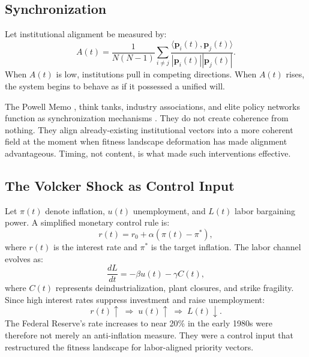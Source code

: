 \documentclass[12pt, a4paper]{article}
\theoremstyle{named}
\begin{document}
\subsection{Synchronization}

Let institutional alignment be measured by:
\[
  A(t) = \frac{1}{N(N-1)}
  \sum_{i \neq j}
  \frac{\langle \mathbf{p}_i(t), \mathbf{p}_j(t)\rangle}
       {|\mathbf{p}_i(t)||\mathbf{p}_j(t)|}.
\]
When $A(t)$ is low, institutions pull in competing directions. When
$A(t)$ rises, the system begins to behave as if it possessed a unified
will.

The Powell Memo \cite{powell1971}, think tanks, industry associations,
and elite policy networks function as synchronization mechanisms
\cite{mirowski2013,harvey2005}. They do not create coherence from
nothing. They align already-existing institutional vectors into a more
coherent field at the moment when fitness landscape deformation has made
alignment advantageous. Timing, not content, is what made such
interventions effective.

\subsection{The Volcker Shock as Control Input}

Let $\pi(t)$ denote inflation, $u(t)$ unemployment, and $L(t)$ labor
bargaining power. A simplified monetary control rule is:
\[
  r(t) = r_0 + \alpha(\pi(t) - \pi^{\ast}),
\]
where $r(t)$ is the interest rate and $\pi^{\ast}$ is the target
inflation. The labor channel evolves as:
\[
  \frac{dL}{dt} = -\beta u(t) - \gamma C(t),
\]
where $C(t)$ represents deindustrialization, plant closures, and strike
fragility. Since high interest rates suppress investment and raise
unemployment:
\[
  r(t)\uparrow \;\Rightarrow\; u(t)\uparrow \;\Rightarrow\; L(t)\downarrow.
\]
The Federal Reserve's rate increases to near 20\% in the early 1980s
were therefore not merely an anti-inflation measure. They were a control
input that restructured the fitness landscape for labor-aligned priority
vectors.
\end{document}
